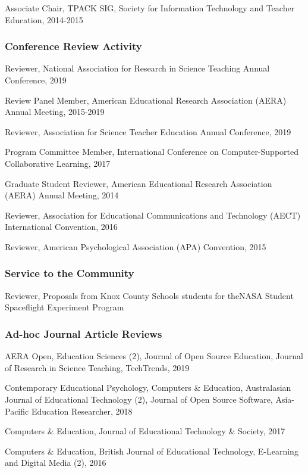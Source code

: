 \documentclass[14,]{article}
\begin{document}
Associate Chair, TPACK SIG, Society for Information Technology and
Teacher Education, 2014-2015

\subsubsection{Conference Review
Activity}\label{conference-review-activity}

Reviewer, National Association for Research in Science Teaching Annual
Conference, 2019

Review Panel Member, American Educational Research Association (AERA)
Annual Meeting, 2015-2019

Reviewer, Association for Science Teacher Education Annual Conference,
2019

Program Committee Member, International Conference on Computer-Supported
Collaborative Learning, 2017

Graduate Student Reviewer, American Educational Research Association
(AERA) Annual Meeting, 2014

Reviewer, Association for Educational Communications and Technology
(AECT) International Convention, 2016

Reviewer, American Psychological Association (APA) Convention, 2015

\subsubsection{Service to the Community}\label{service-to-the-community}

Reviewer, Proposals from Knox County Schools students for theNASA
Student Spaceflight Experiment Program

\subsubsection{Ad-hoc Journal Article
Reviews}\label{ad-hoc-journal-article-reviews}

AERA Open, Education Sciences (2), Journal of Open Source Education,
Journal of Research in Science Teaching, TechTrends, 2019

Contemporary Educational Psychology, Computers \& Education,
Australasian Journal of Educational Technology (2), Journal of Open
Source Software, Asia-Pacific Education Researcher, 2018

Computers \& Education, Journal of Educational Technology \& Society,
2017

Computers \& Education, British Journal of Educational Technology,
E-Learning and Digital Media (2), 2016
\end{document}
